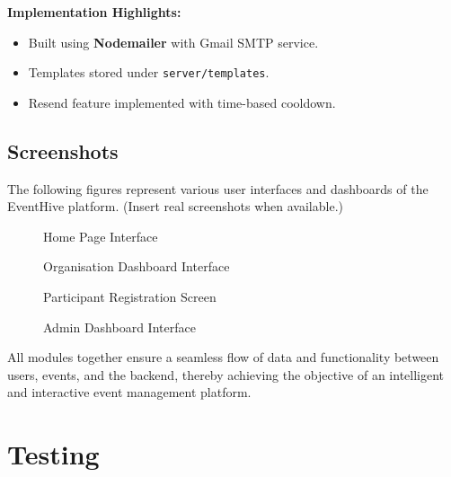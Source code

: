 \documentclass[12pt,a4paper]{report}
\begin{document}
\textbf{Implementation Highlights:}
\begin{itemize}
    \item Built using \textbf{Nodemailer} with Gmail SMTP service.
    \item Templates stored under \texttt{server/templates}.
    \item Resend feature implemented with time-based cooldown.
\end{itemize}

\section{Screenshots}

The following figures represent various user interfaces and dashboards of the EventHive platform. (Insert real screenshots when available.)

\begin{figure}[h]
    \centering
    \caption{Home Page Interface}
\end{figure}

\begin{figure}[h]
    \centering
    \caption{Organisation Dashboard Interface}
\end{figure}

\begin{figure}[h]
    \centering
    \caption{Participant Registration Screen}
\end{figure}

\begin{figure}[h]
    \centering
    \caption{Admin Dashboard Interface}
\end{figure}

\noindent
All modules together ensure a seamless flow of data and functionality between users, events, and the backend, thereby achieving the objective of an intelligent and interactive event management platform.

\chapter{Testing}
\end{document}
